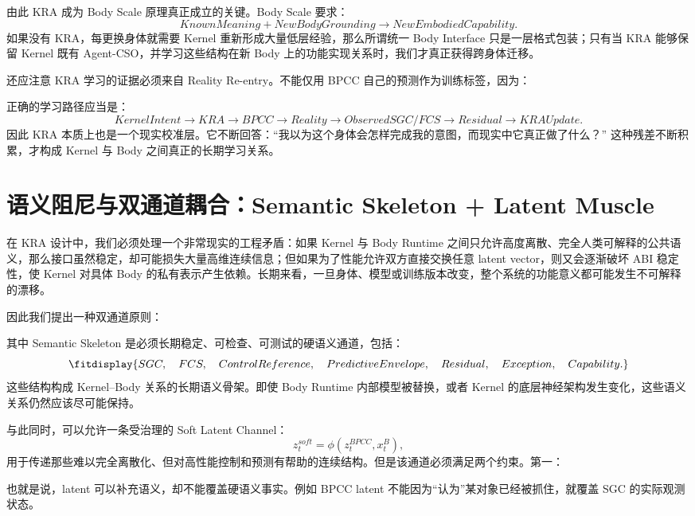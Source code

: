 由此 KRA 成为 Body Scale 原理真正成立的关键。Body Scale 要求：
\[
KnownMeaning
+
NewBodyGrounding
\rightarrow
NewEmbodiedCapability.
\]
如果没有 KRA，每更换身体就需要 Kernel 重新形成大量低层经验，那么所谓统一 Body Interface 只是一层格式包装；只有当 KRA 能够保留 Kernel 既有 Agent-CSO，并学习这些结构在新 Body 上的功能实现关系时，我们才真正获得跨身体迁移。

还应注意 KRA 学习的证据必须来自 Reality Re-entry。不能仅用 BPCC 自己的预测作为训练标签，因为：
\begin{statementbox}
\centering
{}
\end{statementbox}
正确的学习路径应当是：
\[
KernelIntent
\rightarrow
KRA
\rightarrow
BPCC
\rightarrow
Reality
\rightarrow
ObservedSGC/FCS
\rightarrow
Residual
\rightarrow
KRAUpdate.
\]
因此 KRA 本质上也是一个现实校准层。它不断回答：``我以为这个身体会怎样完成我的意图，而现实中它真正做了什么？'' 这种残差不断积累，才构成 Kernel 与 Body 之间真正的长期学习关系。

\section{语义阻尼与双通道耦合：Semantic Skeleton + Latent Muscle}
\label{sec:kra-semantic-damping}

在 KRA 设计中，我们必须处理一个非常现实的工程矛盾：如果 Kernel 与 Body Runtime 之间只允许高度离散、完全人类可解释的公共语义，那么接口虽然稳定，却可能损失大量高维连续信息；但如果为了性能允许双方直接交换任意 latent vector，则又会逐渐破坏 ABI 稳定性，使 Kernel 对具体 Body 的私有表示产生依赖。长期来看，一旦身体、模型或训练版本改变，整个系统的功能意义都可能发生不可解释的漂移。

因此我们提出一种双通道原则：
\begin{statementbox}
\centering
{}
\end{statementbox}

其中 Semantic Skeleton 是必须长期稳定、可检查、可测试的硬语义通道，包括：
\[
\fitdisplay{
SGC,\quad
FCS,\quad
ControlReference,\quad
PredictiveEnvelope,\quad
Residual,\quad
Exception,\quad
Capability.
}
\]
这些结构构成 Kernel--Body 关系的长期语义骨架。即使 Body Runtime 内部模型被替换，或者 Kernel 的底层神经架构发生变化，这些语义关系仍然应该尽可能保持。

与此同时，可以允许一条受治理的 Soft Latent Channel：
\[
z_t^{soft}
=
\phi
\left(
z_t^{BPCC},
x_t^B
\right),
\]
用于传递那些难以完全离散化、但对高性能控制和预测有帮助的连续结构。但是该通道必须满足两个约束。第一：
\begin{statementbox}
\centering
{}
\end{statementbox}
也就是说，latent 可以补充语义，却不能覆盖硬语义事实。例如 BPCC latent 不能因为``认为''某对象已经被抓住，就覆盖 SGC 的实际观测状态。

